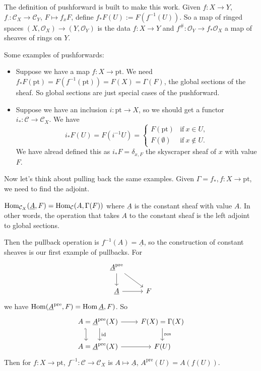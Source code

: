 The definition of pushforward is built to make this work. Given $f \colon X \to Y$, $f_\cdot  \colon \mathcal{C} _X \to \mathcal{C} _Y$, $F \mapsto  f_x F$, define $f_* F(U) := F( f^{-1}(U))$. So a map of ringed spaces $(X, \mathcal{O }_X) \to  (Y, \mathcal{O} _Y) $ is the data $f \colon X \to Y$ and $f ^{\#} \colon \mathcal{O} _Y \to f_*\mathcal{O} _X$ a map of sheaves of rings on $Y$.
\begin{example}
    Some examples of pushforwards:
    \begin{itemize}
    \setlength\itemsep{-.2em}
\item Suppose we have a map $f \colon X \to \mathrm{pt}$. We need $f_* F( \mathrm{pt})= F( f ^{-1}( \mathrm{pt}))=F(X)= \Gamma(F)$, the global sections of the sheaf. So global sections are just special cases of the pushforward.
\item Suppose we have an inclusion $i \colon  \mathrm{pt} \to X$, so we should get a functor $i_* \colon  \mathcal{C} \to \mathcal{C} _X$. We have 
    \[
    i_* F(U)= F( i ^{-1} U)=
    \begin{cases}
        F( \mathrm{pt}) & \text{if} \ x \in U,\\
        F(\emptyset) & \text{if} \ x\notin U.
    \end{cases}
    \] We have alread defined this as $i_* F= \delta _{x,F}$ the skyscraper sheaf of $x$ with value $F$.
    \end{itemize}
\end{example}
    Now let's think about pulling back the same examples.
Given $\Gamma = f_*, f \colon X \to \mathrm{pt}$, we need to find the adjoint.
    \begin{lemma}
        $\operatorname{Hom} _{\mathcal{C} _X}(\underline{A},F)=\operatorname{Hom} _{\mathcal{C} }(A, \Gamma(F))$ where $\underline{A}$ is the constant sheaf with value $A$. In other words, the operation that takes $A$ to the constant sheaf is the left adjoint to global sections.
    \end{lemma}Then the pullback operation is $f ^{-1}(A)= \underline{A}$, so the construction of constant sheaves is our first example of pullbacks. For \[
    \begin{tikzcd}
        \underline{A} ^{\mathrm{pre}}\arrow[rd] \arrow[d]  & \\
        \underline{A} \arrow[r] & F
    \end{tikzcd}
\] we have $\operatorname{Hom} (\underline{A}^{\mathrm{pre}},F)=\operatorname{Hom} \underline A , F)$. So \[
\begin{tikzcd}
A=\underline A^{\mathrm{pre}}(X) \arrow[d, "\id", shift left] \arrow[d, hook', shift right=7] \arrow[r] & F(X)=\Gamma(X) \arrow[d, "\mathrm{res}"] \\
A=\underline A^{\mathrm{pre}}(X) \arrow[r]                                                            & F(U)                                    
\end{tikzcd}
\] Then for $f \colon X \to \mathrm{pt}$, $f ^{-1} \colon \mathcal{C}  \to \mathcal{C} _X$ is $A \mapsto \underline A$, $A ^{\mathrm{pre}}(U)= A (f(U))$.

